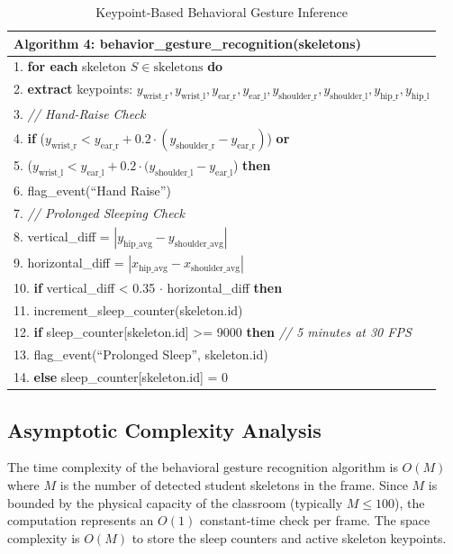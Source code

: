 \documentclass[12pt,a4paper,oneside]{report}
\begin{document}
\begin{table}[htbp]
\caption{Keypoint-Based Behavioral Gesture Inference}
\centering
\small
{}
\begin{tabular}{p{5.5in}}
\hline
\textbf{Algorithm 4: behavior\_gesture\_recognition(skeletons)} \\ \hline
1. \textbf{for each} skeleton $S \in \text{skeletons}$ \textbf{do} \\
2. \quad \textbf{extract} keypoints: $y_{\text{wrist\_r}}, y_{\text{wrist\_l}}, y_{\text{ear\_r}}, y_{\text{ear\_l}}, y_{\text{shoulder\_r}}, y_{\text{shoulder\_l}}, y_{\text{hip\_r}}, y_{\text{hip\_l}}$ \\
3. \quad \textit{// Hand-Raise Check} \\
4. \quad \textbf{if} ($y_{\text{wrist\_r}} < y_{\text{ear\_r}} + 0.2 \cdot (y_{\text{shoulder\_r}} - y_{\text{ear\_r}})$) \textbf{or} \\
5. \quad\quad ($y_{\text{wrist\_l}} < y_{\text{ear\_l}} + 0.2 \cdot (y_{\text{shoulder\_l}} - y_{\text{ear\_l}}$) \textbf{then} \\
6. \quad\quad flag\_event(``Hand Raise'') \\
7. \quad \textit{// Prolonged Sleeping Check} \\
8. \quad vertical\_diff = $|y_{\text{hip\_avg}} - y_{\text{shoulder\_avg}}|$ \\
9. \quad horizontal\_diff = $|x_{\text{hip\_avg}} - x_{\text{shoulder\_avg}}|$ \\
10. \quad \textbf{if} vertical\_diff < 0.35 $\cdot$ horizontal\_diff \textbf{then} \\
11. \quad\quad increment\_sleep\_counter(skeleton.id) \\
12. \quad\quad \textbf{if} sleep\_counter[skeleton.id] >= 9000 \textbf{then} \textit{// 5 minutes at 30 FPS} \\
13. \quad\quad\quad flag\_event(``Prolonged Sleep'', skeleton.id) \\
14. \quad\quad \textbf{else} sleep\_counter[skeleton.id] = 0 \\ \hline
\end{tabular}
\label{tab:behavior_gesture}
\end{table}

\subsection{Asymptotic Complexity Analysis}
The time complexity of the behavioral gesture recognition algorithm is $O(M)$ where $M$ is the number of detected student skeletons in the frame. Since $M$ is bounded by the physical capacity of the classroom (typically $M \le 100$), the computation represents an $O(1)$ constant-time check per frame. The space complexity is $O(M)$ to store the sleep counters and active skeleton keypoints.
\end{document}

